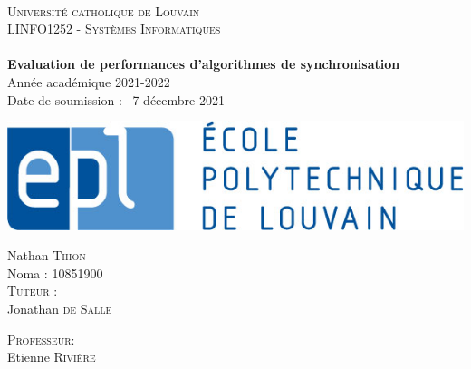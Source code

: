 



\begin{titlepage}
  \begin{sffamily}
  \begin{center}

    ~\\[0.5cm]\textsc{\LARGE Université catholique de Louvain}\\[0.5cm]
    
    \textsc{\Large LINFO1252 - Systèmes Informatiques }\\[2cm]
    

    \HRule \\[0.7cm]
    \textbf{ \huge Evaluation de performances d'algorithmes de synchronisation } \\[4mm]
    \Large{Année académique 2021-2022} \\[2mm]
    \large{Date de soumission : \ 7 décembre 2021}
    \HRule \\[2cm]
    
    \begin{center}
        \includegraphics[scale=0.65]{img/epl-logo.jpg}
    \end{center}
    \vspace{2cm}
    \begin{minipage}{1.0\textwidth}
      \begin{center} \large
        Nathan \textsc{Tihon} \\[0.1cm]
        Noma : \textsc{10851900}\\
        \vspace{0.5cm}
        \textsc{Tuteur :} \\[0.1cm]
        Jonathan \textsc{de Salle}
        \vspace{0.5cm}
        
        \textsc{Professeur:}\\[0.1cm]
         Etienne \textsc{Rivière} \\
      \end{center}
    \end{minipage}
    \\[0.3cm]

    \vfill
{\large }%
  \end{center}
  \end{sffamily}
\end{titlepage}

